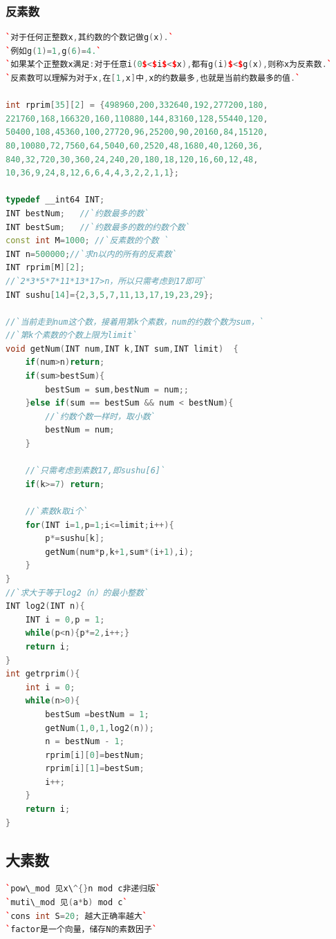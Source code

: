 \documentclass[a4paper]{article}
\begin{document}
\begin{CJK*}{UTF8}{gbsn}
\begin{multicols}{3}
\begin{flushleft}
\subsubsection{反素数}

\begin{lstlisting}[language={c++}]
`对于任何正整数x,其约数的个数记做g(x).`
`例如g(1)=1,g(6)=4.`
`如果某个正整数x满足:对于任意i(0$<$i$<$x),都有g(i)$<$g(x),则称x为反素数.`
`反素数可以理解为对于x,在[1,x]中,x的约数最多,也就是当前约数最多的值.`

int rprim[35][2] = {498960,200,332640,192,277200,180, 
221760,168,166320,160,110880,144,83160,128,55440,120,
50400,108,45360,100,27720,96,25200,90,20160,84,15120,
80,10080,72,7560,64,5040,60,2520,48,1680,40,1260,36,
840,32,720,30,360,24,240,20,180,18,120,16,60,12,48,
10,36,9,24,8,12,6,6,4,4,3,2,2,1,1};

typedef __int64 INT;
INT bestNum;   //`约数最多的数`
INT bestSum;   //`约数最多的数的约数个数`
const int M=1000; //`反素数的个数 `
INT n=500000;//`求n以内的所有的反素数`
INT rprim[M][2];
//`2*3*5*7*11*13*17>n，所以只需考虑到17即可`
INT sushu[14]={2,3,5,7,11,13,17,19,23,29};  

//`当前走到num这个数，接着用第k个素数，num的约数个数为sum，`
//`第k个素数的个数上限为limit`
void getNum(INT num,INT k,INT sum,INT limit)  {
 	if(num>n)return;
	if(sum>bestSum){
		bestSum = sum,bestNum = num;;
	}else if(sum == bestSum && num < bestNum){  
		//`约数个数一样时，取小数`
		bestNum = num;
	}

	//`只需考虑到素数17,即sushu[6]`
	if(k>=7) return; 
	
	//`素数k取i个`
	for(INT i=1,p=1;i<=limit;i++){   
		p*=sushu[k];
		getNum(num*p,k+1,sum*(i+1),i);
	}
}
//`求大于等于log2（n）的最小整数`
INT log2(INT n){  
	INT i = 0,p = 1;
	while(p<n){p*=2,i++;}
	return i;
}
int getrprim(){
	int i = 0;
	while(n>0){
		bestSum =bestNum = 1;
		getNum(1,0,1,log2(n));
		n = bestNum - 1;
		rprim[i][0]=bestNum;
		rprim[i][1]=bestSum;
		i++;
	}
	return i;	
}
\end{lstlisting}


\subsection{大素数}
\begin{lstlisting}[language={c++}]
`pow\_mod 见x\^{}n mod c非递归版`
`muti\_mod 见(a*b) mod c`
`cons int S=20; 越大正确率越大`
`factor是一个向量，储存N的素数因子`
\end{lstlisting}



\end{flushleft}
\end{multicols}
\end{CJK*}
\end{document}

